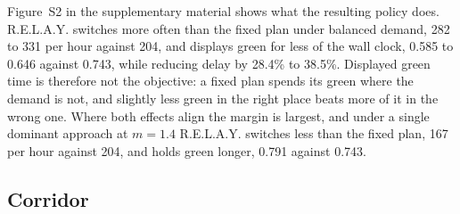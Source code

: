 \documentclass[journal]{IEEEtran}
\newcommand{\relay}{R.E.L.A.Y.}
\begin{document}
Figure~S2 in the supplementary material shows what the resulting policy does. \relay{} switches more often than the
fixed plan under balanced demand, 282 to 331 per hour against 204, and displays green for less of the
wall clock, 0.585 to 0.646 against 0.743, while reducing delay by 28.4\% to 38.5\%. Displayed green
time is therefore not the objective: a fixed plan spends its green where the demand is not, and
slightly less green in the right place beats more of it in the wrong one. Where both effects align
the margin is largest, and under a single dominant approach at $m = 1.4$ \relay{} switches less than
the fixed plan, 167 per hour against 204, and holds green longer, 0.791 against 0.743.

\subsection{Corridor}
\end{document}

